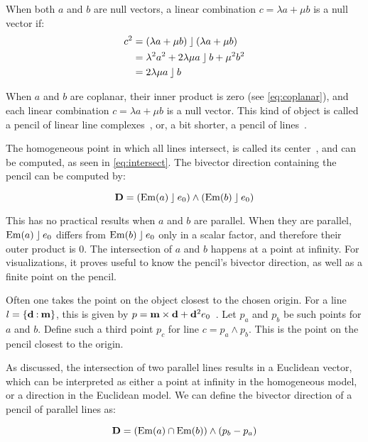 When both $a$ and $b$ are null vectors, a linear combination $c = \lambda a + \mu b$ is a null vector if:
\begin{align}
  \label{eq:lincombnull}
  c^2 &= (\lambda a + \mu b) \mathbin{\rfloor} (\lambda a + \mu b) \nonumber \\
  &= \lambda^2 a^2 + 2 \lambda \mu a \mathbin{\rfloor} b + \mu^2 b^2 \nonumber \\
  &= 2 \lambda \mu a \mathbin{\rfloor} b
\end{align}

When $a$ and $b$ are coplanar, their inner product is zero (see \autoref{eq:coplanar}), and each linear combination $c = \lambda a + \mu b$ is a null vector.  This kind of object is called a pencil of linear line complexes~\cite[Section 3.2.1]{Pottmann}, or, a bit shorter, a pencil of lines~\cite{Hongbo}.

The homogeneous point in which all lines intersect, is called its center~\cite{Hongbo}, and can be computed, as seen in \autoref{eq:intersect}.  The bivector direction containing the pencil can be computed by:

\begin{equation*}
  \mathbf{D} = \left(\operatorname{Em}(a) \mathbin{\rfloor} e_0 \right) \wedge \left(\operatorname{Em}(b) \mathbin{\rfloor} e_0\right)
\end{equation*}

This has no practical results when $a$ and $b$ are parallel.  When they are parallel, $\operatorname{Em}(a) \mathbin{\rfloor} e_0$ differs from $\operatorname{Em}(b) \mathbin{\rfloor} e_0$ only in a scalar factor, and therefore their outer product is $0$.  The intersection of $a$ and $b$ happens at a point at infinity.  For visualizations, it proves useful to know the pencil's bivector direction, as well as a finite point on the pencil.  

Often one takes the point on the object closest to the chosen origin.  For a line $l = \{\mathbf{d} \mathbin{:} \mathbf{m}\}$, this is given by $p = \mathbf{m} \times \mathbf{d} + \mathbf{d}^2 e_0$~\cite{Shoemake}.  Let $p_a$ and $p_b$ be such points for $a$ and $b$.  Define such a third point $p_c$ for line $c = p_a \wedge p_b$.  This is the point on the pencil closest to the origin.  

As discussed, the intersection of two parallel lines results in a Euclidean vector, which can be interpreted as either a point at infinity in the homogeneous model, or a direction in the Euclidean model.  We can define the bivector direction of a pencil of parallel lines as:

\begin{equation*}
  \mathbf{D} = \left(\operatorname{Em}(a) \cap \operatorname{Em}(b)\right) \wedge \left(p_b - p_a\right)
\end{equation*}

